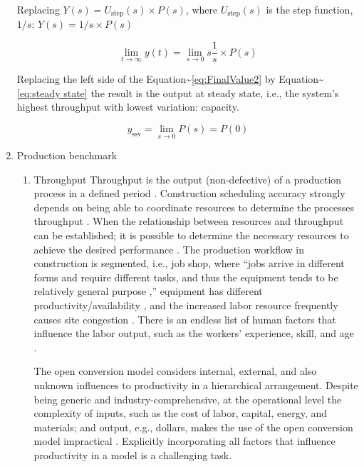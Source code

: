 \documentclass{article}
\begin{document}
\begin{enumerate}
Replacing \(Y(s) = U_{\mbox{step}}(s) \times P(s)\), where \(U_{\mbox{step}}(s)\) is the step function, \(1/s\): \(Y(s) = 1/s \times P(s)\)

\begin{equation}\label{eq:FinalValue2}
	\lim_{t\rightarrow \infty} y(t)=\lim_{s \rightarrow 0} s \frac{1}{s} \times P(s)
\end{equation}

Replacing the left side of the Equation\textasciitilde{}\ref{eq:FinalValue2} by Equation\textasciitilde{}\ref{eq:steady state} the result is the output at steady state, i.e., the system's highest throughput with lowest variation: capacity.

\begin{equation}\label{eq:Capacity}
	y_{\mbox{ssv}} = \lim_{s \rightarrow 0} P(s) = P(0)
\end{equation}

\item Production benchmark
\label{sec:org759677b}
\begin{enumerate}
\item Throughput
\label{sec:orgd467e95}
Throughput is the output (non-defective) of a production process in a defined period \cite{Hopp2001}.
Construction scheduling accuracy strongly depends on being able to coordinate resources to determine the processes throughput \cite{Cho2011}.
When the relationship between resources and throughput can be established;
it is possible to determine the necessary resources to achieve the desired performance \cite{Cho2011}.
The production workflow in construction is segmented, i.e., job shop, where ``jobs arrive in different forms and require different tasks, and thus the equipment tends to be relatively general purpose \cite{Hayes1979},'' equipment has different productivity/availability \cite{Ok2006}, and the increased labor resource frequently causes site congestion \cite{Cho2011}.
There is an endless list of human factors that influence the labor output, such as the workers' experience, skill, and age \cite{El-Gohary2014}.

The open conversion model \cite{Kellogg1981} considers internal, external, and also unknown influences to productivity in a hierarchical arrangement.
Despite being generic and industry-comprehensive, at the operational level the complexity of inputs, such as the cost of labor, capital, energy, and materials; and output, e.g., dollars, makes the use of the open conversion model impractical \cite{Thomas1990}.
Explicitly incorporating all factors that influence productivity in a model is a challenging task.


\end{enumerate}
\end{enumerate}
\end{document}
